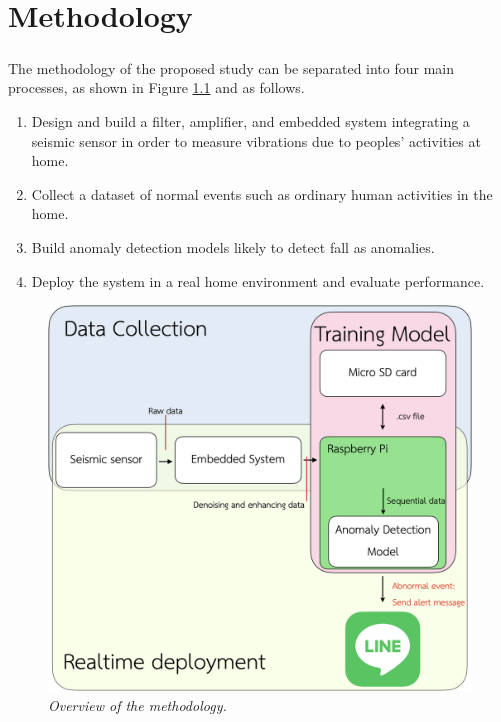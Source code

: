 \setlength{\parindent}{0in} 
\setlength{\parskip}{1em}
\setlength{\baselineskip}{1.6em}

\chapter{Methodology}
\label{ch:methodology}
\paragraph{}
The methodology of the proposed study can be separated into four main processes, as shown in Figure \ref{fig:system_overview} and as follows.
\begin{enumerate}
\item Design and build a filter, amplifier, and embedded system integrating a seismic sensor in order to measure vibrations due to peoples' activities at home.
\item Collect a dataset of normal events such as ordinary human activities in the home.
\item Build anomaly detection models likely to detect fall as anomalies.
\item Deploy the system in a real home environment and evaluate performance.
\end{enumerate}

\begin{figure}[H]
  \centering
  \caption[Overview of the methodology.]{\emph{Overview of the methodology.}}\label{fig:system_overview}
  \includegraphics[scale = 0.2]{figures/system_overview.jpg}  
\end{figure}

